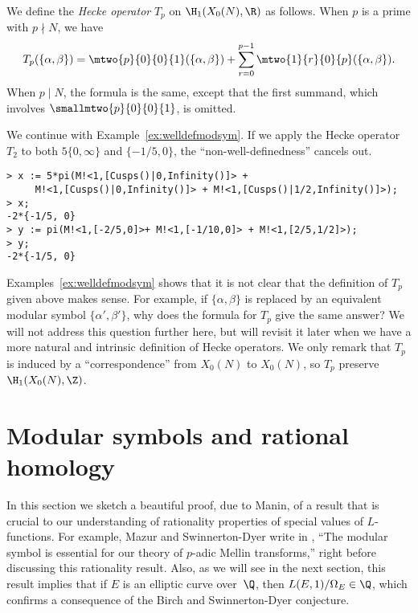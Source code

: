 \documentclass{report}
\begin{document}
\begin{definition}
We define the {\em Hecke operator} $T_p$ on $\H_1(X_0(N),\R)$ as
follows. When $p$ is a prime with $p\nmid N$, we have
\[
 T_p(\{\alpha,\beta\}) = \mtwo{p}{0}{0}{1}(\{\alpha,\beta\}) + \sum_{r=0}^{p-1}\mtwo{1}{r}{0}{p}(\{\alpha,\beta\}).
\]
When $p\mid N$, the formula is the same, except that the first
summand, which involves $\smallmtwo{p}{0}{0}{1}$, is omitted.
\end{definition}

\begin{example}\label{ex:heckeopmodsym}
We continue with Example~\ref{ex:welldefmodsym}. If we apply the Hecke operator
$T_2$ to both $5\{0,\infty\}$ and $\{-1/5,0\}$, the
``non-well-definedness'' cancels out.
\begin{verbatim}
> x := 5*pi(M!<1,[Cusps()|0,Infinity()]> +
     M!<1,[Cusps()|0,Infinity()]> + M!<1,[Cusps()|1/2,Infinity()]>);
> x;
-2*{-1/5, 0}
> y := pi(M!<1,[-2/5,0]>+ M!<1,[-1/10,0]> + M!<1,[2/5,1/2]>);
> y;
-2*{-1/5, 0}
\end{verbatim}
\end{example}

Examples~\ref{ex:welldefmodsym} shows that it is not clear that
the definition of $T_p$ given above makes sense.  For example, if
$\{\alpha,\beta\}$ is replaced by an equivalent modular symbol
$\{\alpha',\beta'\}$, why does the formula for $T_p$ give the same
answer? We will not address this question further here, but will
revisit it later when we
have a more natural and intrinsic definition of Hecke operators.
We only remark that $T_p$ is induced by a ``correspondence'' from
$X_0(N)$ to $X_0(N)$, so $T_p$ preserve $\H_1(X_0(N),\Z)$.

\section{Modular symbols and rational homology}
In this section we sketch a beautiful proof, due to Manin, of a
result that is crucial to our understanding of rationality
properties of special values of $L$-functions.  For example, Mazur
and Swinnerton-Dyer write in
\cite[\S6]{mazur-swinnerton-dyer:arithmetic}, ``The modular symbol
is essential for our theory of $p$-adic Mellin transforms,'' right
before discussing this rationality result.  Also, as we will see
in the next section, this result implies that if $E$ is an
elliptic curve over~$\Q$, then $L(E,1)/\Omega_E\in\Q$, which
confirms a consequence of the Birch and Swinnerton-Dyer
conjecture.
\end{document}
